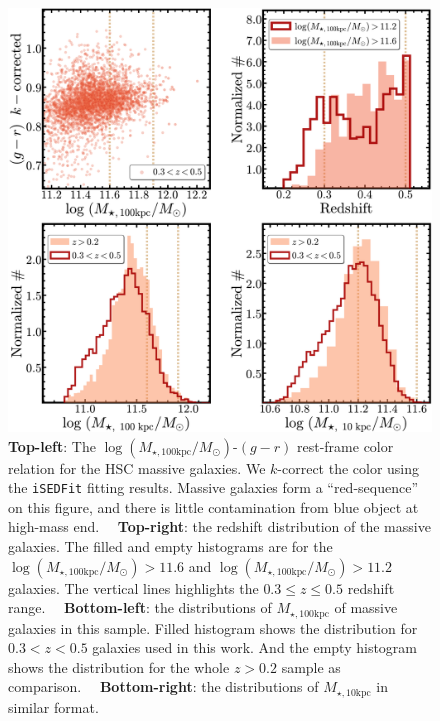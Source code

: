 \documentclass[a4paper,fleqn,usenatbib]{mnras}
\def\minn{{$M_{\star,10\mathrm{kpc}}$}}
\def\mtot{{$M_{\star,100\mathrm{kpc}}$}}
\def\logmtot{{$\log (M_{\star,100\mathrm{kpc}}/M_{\odot})$}}
\begin{document}
  \begin{figure}
      \centering 
      \includegraphics[width=\columnwidth]{fig/redbcg_sample_stats}
      \caption{
          \textbf{Top-left}: The \logmtot{}-$(g-r)$ rest-frame color relation for the 
          HSC massive galaxies.
          We $k$-correct the color using the \texttt{iSEDFit} fitting results.
          Massive galaxies form a ``red-sequence'' on this figure, and there is 
          little contamination from blue object at high-mass end.~~          
          \textbf{Top-right}: the redshift distribution of the massive galaxies. 
          The filled and empty histograms are for the \logmtot{}$>11.6$ and 
          \logmtot{}$>11.2$ galaxies.
          The vertical lines highlights the $0.3\leq z \leq 0.5$ redshift range.~~
          \textbf{Bottom-left}: the distributions of \mtot{} of massive galaxies in 
          this sample. 
          Filled histogram shows the distribution for $0.3 < z < 0.5$ galaxies 
          used in this work. 
          And the empty histogram shows the distribution for the whole $z>0.2$ sample
          as comparison.~~
          \textbf{Bottom-right}: the distributions of \minn{} in similar format. 
      }
      \label{fig:sample_stats}
  \end{figure}
   
\end{document}
